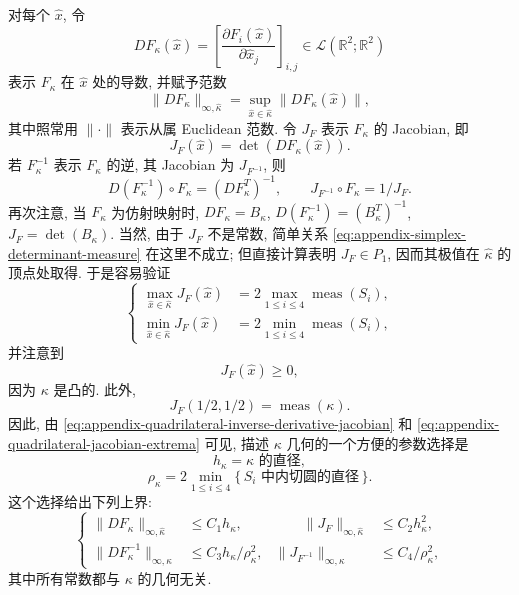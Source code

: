 对每个 $\hat x$, 令
\[
DF_\kappa(\hat x)
=
\left[
\frac{\partial F_i(\hat x)}{\partial\hat x_j}
\right]_{i,j}
\in
\mathcal{L}(\mathbb{R}^2;\mathbb{R}^2)
\]
表示 $F_\kappa$ 在 $\hat x$ 处的导数, 并赋予范数
\[
\|DF_\kappa\|_{\infty,\hat\kappa}
=
\sup_{\hat x\in\hat\kappa}\|DF_\kappa(\hat x)\|,
\]
其中照常用 $\|\cdot\|$ 表示从属 Euclidean 范数.
令 $J_F$ 表示 $F_\kappa$ 的 Jacobian, 即
\[
J_F(\hat x)=\det(DF_\kappa(\hat x)).
\]
若 $F_\kappa^{-1}$ 表示 $F_\kappa$ 的逆, 其 Jacobian 为
$J_{F^{-1}}$, 则
\begin{equation}\label{eq:appendix-quadrilateral-inverse-derivative-jacobian}
D(F_\kappa^{-1})\circ F_\kappa
=
(DF_\kappa^T)^{-1},
\qquad
J_{F^{-1}}\circ F_\kappa
=
1/J_F.
\end{equation}
再次注意, 当 $F_\kappa$ 为仿射映射时,
$DF_\kappa=B_\kappa$,
$D(F_\kappa^{-1})=(B_\kappa^T)^{-1}$,
$J_F=\det(B_\kappa)$.
当然, 由于 $J_F$ 不是常数, 简单关系
\eqref{eq:appendix-simplex-determinant-measure} 在这里不成立;
但直接计算表明 $J_F\in P_1$, 因而其极值在 $\hat\kappa$ 的顶点处取得.
于是容易验证
\begin{equation}\label{eq:appendix-quadrilateral-jacobian-extrema}
\left\{
\begin{aligned}
\max_{\hat x\in\hat\kappa}J_F(\hat x)
&=
2\max_{1\leq i\leq4}\operatorname{meas}(S_i),\\
\min_{\hat x\in\hat\kappa}J_F(\hat x)
&=
2\min_{1\leq i\leq4}\operatorname{meas}(S_i),
\end{aligned}
\right.
\end{equation}
并注意到
\[
J_F(\hat x)\geq0,
\]
因为 $\kappa$ 是凸的. 此外,
\[
J_F(1/2,1/2)=\operatorname{meas}(\kappa).
\]
因此, 由 \eqref{eq:appendix-quadrilateral-inverse-derivative-jacobian}
和 \eqref{eq:appendix-quadrilateral-jacobian-extrema} 可见,
描述 $\kappa$ 几何的一个方便的参数选择是
\[
h_\kappa=\text{$\kappa$ 的直径},
\]
\[
\rho_\kappa
=
2\min_{1\leq i\leq4}
\{\,\text{$S_i$ 中内切圆的直径}\,\}.
\]
这个选择给出下列上界:
\begin{equation}\label{eq:appendix-quadrilateral-map-bounds}
\left\{
\begin{aligned}
\|DF_\kappa\|_{\infty,\hat\kappa}
&\leq C_1h_\kappa,
&\qquad
\|J_F\|_{\infty,\hat\kappa}
&\leq C_2h_\kappa^2,\\
\|DF_\kappa^{-1}\|_{\infty,\kappa}
&\leq C_3h_\kappa/\rho_\kappa^2,
&
\|J_{F^{-1}}\|_{\infty,\kappa}
&\leq C_4/\rho_\kappa^2,
\end{aligned}
\right.
\end{equation}
其中所有常数都与 $\kappa$ 的几何无关.

